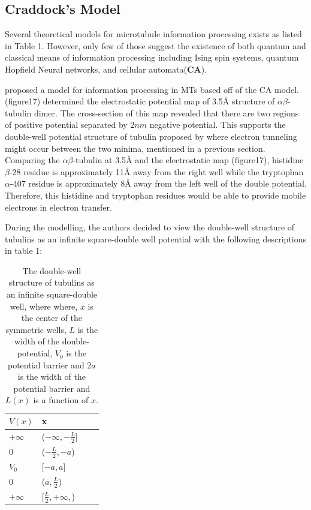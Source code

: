 \documentclass[letterpaper,final,times]{cas-dc}
\numberwithin{equation}{section}
\begin{document}
\subsection{Craddock's Model}
Several theoretical models for microtubule information processing exists as listed in Table 1. However, only few of those suggest the existence of both quantum and classical means of information processing including Ising spin systems\citep{9}, quantum Hopfield Neural networks\citep{90}, and cellular automata(\textbf{CA})\citep{91}.

\citet{92} proposed a model for information processing in MTs based off of the CA model. \citet{101}(figure17) determined the electrostatic potential map of 3.5Å structure of $\alpha\beta$-tubulin dimer\citep{85}. The cross-section of this map revealed that there are two regions of positive potential separated by $2nm$ negative potential. This supports the double-well potential structure of tubulin proposed by \citet{7} where electron tunneling might occur between the two minima, mentioned in a previous section. Comparing the $\alpha\beta$-tubulin at 3.5Å and the electrostatic map (figure17), histidine $\beta$-28 residue is approximately 11Å away from the right well while the tryptophan $\alpha$-407 residue is approximately 8Å away from the left well of the double potential. Therefore, this histidine and tryptophan residues would be able to provide mobile electrons in electron transfer\citep{92}.

During the modelling, the authors decided to view the double-well structure of tubulins as an infinite square-double well potential with the following descriptions in table 1:
\begin{table}[width=1\linewidth,cols=1,pos=h]
\begin{tabular*}{\tblwidth}{@{} LLLL@{} }
\toprule
$V(x)$ & x\\
\midrule
$+\infty$ & ($-\infty, -\frac{L}{2}$] \\
$0$ & ($-\frac{L}{2}, -a$) \\
$V_0$ & [$-a, a$] \\
$0$ & ($a, \frac{L}{2}$) \\
$+\infty$ & [$\frac{L}{2}, +\infty,$) \\
\bottomrule
\end{tabular*}
\caption{The double-well structure of tubulins as an infinite square-double well, where where, $x$ is the center of the symmetric wells, $L$ is the width of the double-potential, $V_0$ is the potential barrier and $2a$ is the width of the potential barrier and $L(x)$ is a function of $x$.}\label{tbl1}
\end{table}
\end{document}
